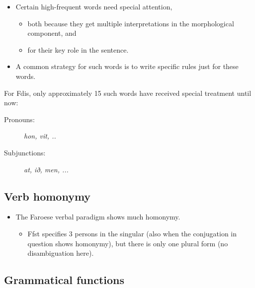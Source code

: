 \documentclass{article}
\begin{document}
\begin{itemize}
\item Certain high-frequent words need special attention, 
\begin{itemize}
\item both because they get multiple interpretations in the morphological component, and 
\item for their key role in the sentence.
\end{itemize} 
\item A common strategy for such words is to write specific rules just for these words.  \\ 
\end{itemize} 

For Fdis, only approximately 15 such words have received special treatment until now:

\begin{description}
\item [Pronouns:] \textit{hon, vit, ..}
\item [Subjunctions:] \textit{at, ið, men, ...}
\end{description}
\subsection{Verb homonymy}

\begin{itemize}
\item The Faroese verbal paradigm shows much homonymy. 
\begin{itemize}
\item Ffst specifies 3 persons in the singular (also when the conjugation in question shows homonymy), 
but there is only one plural form (no disambiguation here). 
\end{itemize} 
\end{itemize} 

\subsection{Grammatical functions}
\end{document}
